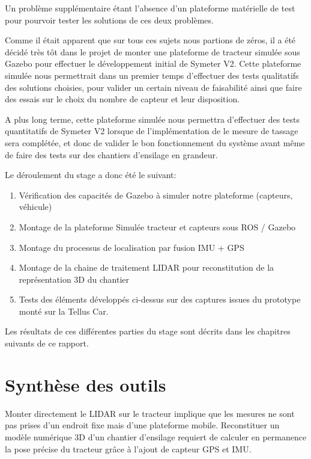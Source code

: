\documentclass[12pt,a4paper]{report}
\begin{document}
	\para Un problème supplémentaire étant l'absence d'un plateforme matérielle de test pour pourvoir tester les solutions de ces deux problèmes.
	
	\para Comme il était apparent que sur tous ces sujets nous partions de zéros, il a été décidé très tôt dans le projet de monter une plateforme de tracteur simulée sous Gazebo pour effectuer le développement initial de Symeter V2. Cette plateforme simulée nous permettrait dans un premier temps d'effectuer des tests qualitatifs des solutions choisies, pour valider un certain niveau de faisabilité ainsi que faire des essais sur le choix du nombre de capteur et leur disposition.
	
	\para A plus long terme, cette plateforme simulée nous permettra d'effectuer des tests quantitatifs de Symeter V2 lorsque de l'implémentation de le mesure de tassage sera complétée, et donc de valider le bon fonctionnement du système avant même de faire des tests sur des chantiers d'ensilage en grandeur.
	
	\para Le déroulement du stage a donc été le suivant:
	\begin{enumerate}
		\item Vérification des capacités de Gazebo à simuler notre plateforme (capteurs, véhicule)
		\item Montage de la plateforme Simulée tracteur et capteurs sous ROS / Gazebo
		\item Montage du processus de localisation par fusion IMU + GPS
		\item Montage de la chaine de traitement LIDAR pour reconstitution de la représentation 3D du chantier
		\item Tests des éléments développés ci-dessus sur des captures issues du prototype monté sur la Tellus Car.
	\end{enumerate}

	\para Les résultats de ces différentes parties du stage sont décrits dans les chapitres suivants de ce rapport.
	
	\section{Synthèse des outils}
	Monter directement le LIDAR sur le tracteur implique que les mesures ne sont pas prises d'un endroit fixe mais d'une plateforme mobile. Reconstituer un modèle numérique 3D d'un chantier d'ensilage requiert de calculer en permanence la pose précise du tracteur grâce à l'ajout de capteur GPS et IMU.
	
\end{document}
